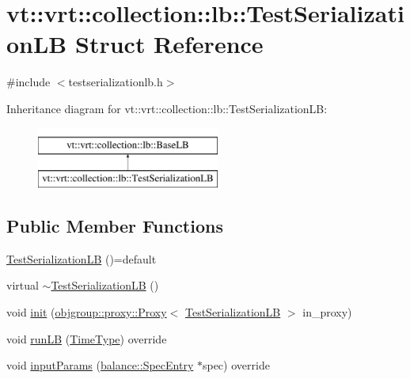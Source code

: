 \hypertarget{structvt_1_1vrt_1_1collection_1_1lb_1_1_test_serialization_l_b}{}\section{vt\+:\+:vrt\+:\+:collection\+:\+:lb\+:\+:Test\+Serialization\+LB Struct Reference}
\label{structvt_1_1vrt_1_1collection_1_1lb_1_1_test_serialization_l_b}


{\ttfamily \#include $<$testserializationlb.\+h$>$}

Inheritance diagram for vt\+:\+:vrt\+:\+:collection\+:\+:lb\+:\+:Test\+Serialization\+LB\+:\begin{figure}[H]
\begin{center}
\leavevmode
\includegraphics[height=2.000000cm]{structvt_1_1vrt_1_1collection_1_1lb_1_1_test_serialization_l_b}
\end{center}
\end{figure}
\subsection*{Public Member Functions}
\begin{DoxyCompactItemize}
\item 
\hyperlink{structvt_1_1vrt_1_1collection_1_1lb_1_1_test_serialization_l_b_ae484c610a000141d0168d29da8ee8e08}{Test\+Serialization\+LB} ()=default
\item 
virtual \hyperlink{structvt_1_1vrt_1_1collection_1_1lb_1_1_test_serialization_l_b_aa90398f1c00e00b6cb422e42d8c7860c}{$\sim$\+Test\+Serialization\+LB} ()
\item 
void \hyperlink{structvt_1_1vrt_1_1collection_1_1lb_1_1_test_serialization_l_b_ac19e5c9f52661444430932018eadce68}{init} (\hyperlink{structvt_1_1objgroup_1_1proxy_1_1_proxy}{objgroup\+::proxy\+::\+Proxy}$<$ \hyperlink{structvt_1_1vrt_1_1collection_1_1lb_1_1_test_serialization_l_b}{Test\+Serialization\+LB} $>$ in\+\_\+proxy)
\item 
void \hyperlink{structvt_1_1vrt_1_1collection_1_1lb_1_1_test_serialization_l_b_a47b93135928a6f1635d7c71995d4ed11}{run\+LB} (\hyperlink{namespacevt_a876a9d0cd5a952859c72de8a46881442}{Time\+Type}) override
\item 
void \hyperlink{structvt_1_1vrt_1_1collection_1_1lb_1_1_test_serialization_l_b_ab47faba8dbbed428c3f00597fcf9235c}{input\+Params} (\hyperlink{structvt_1_1vrt_1_1collection_1_1balance_1_1_spec_entry}{balance\+::\+Spec\+Entry} $\ast$spec) override
\end{DoxyCompactItemize}
